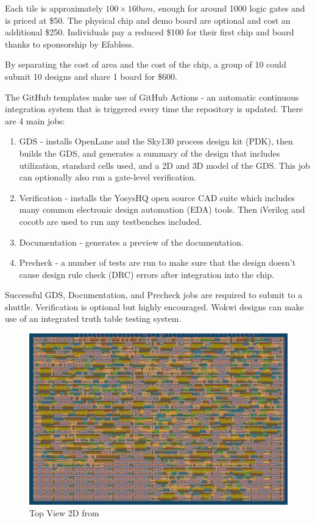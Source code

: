 Each tile is approximately $100\times 160 um$, enough for around 1000 logic gates and is priced at \$50.
The physical chip and demo board are optional and cost an additional \$250.
Individuals pay a reduced \$100 for their first chip and board thanks to sponsorship by Efabless\cite{efabless}.

By separating the cost of area and the cost of the chip, a group of 10 could submit 10 designs and share 1 board for \$600.

The GitHub templates\cite{verilogtemplate} make use of GitHub Actions\cite{githubactions} - an automatic continuous integration system that is triggered every time the repository is updated.
There are 4 main jobs:

\begin{enumerate}
	\item GDS - installs OpenLane and the Sky130 process design kit (PDK), then builds the GDS, and generates a summary of the design that includes utilization, standard cells used, and a 2D and 3D model of the GDS.
This job can optionally also run a gate-level verification.
	\item Verification - installs the YosysHQ open source CAD suite which includes many common electronic design automation (EDA) tools.
Then iVerilog and cocotb are used to run any testbenches included.
	\item Documentation - generates a preview of the documentation.
	\item Precheck - a number of tests are run to make sure that the design doesn’t cause design rule check (DRC) errors after integration into the chip.
\end{enumerate}

Successful GDS, Documentation, and Precheck jobs are required to submit to a shuttle.
Verification is optional but highly encouraged. Wokwi designs can make use of an integrated truth table testing system\cite{automatedtesting}.

\begin{figure}[H]
\centering
	\includegraphics[width=\columnwidth]{./Figs/gh action gds layout.png}
	\caption{Top View 2D from}
	\label{fig:top_view_gds}
\end{figure}

